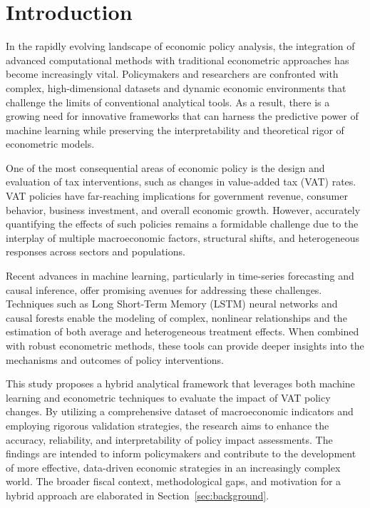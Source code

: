 \section{Introduction}


In the rapidly evolving landscape of economic policy analysis, the integration of advanced computational methods with traditional econometric approaches has become increasingly vital. Policymakers and researchers are confronted with complex, high-dimensional datasets and dynamic economic environments that challenge the limits of conventional analytical tools. As a result, there is a growing need for innovative frameworks that can harness the predictive power of machine learning while preserving the interpretability and theoretical rigor of econometric models.

One of the most consequential areas of economic policy is the design and evaluation of tax interventions, such as changes in value-added tax (VAT) rates. VAT policies have far-reaching implications for government revenue, consumer behavior, business investment, and overall economic growth. However, accurately quantifying the effects of such policies remains a formidable challenge due to the interplay of multiple macroeconomic factors, structural shifts, and heterogeneous responses across sectors and populations.

Recent advances in machine learning, particularly in time-series forecasting and causal inference, offer promising avenues for addressing these challenges. Techniques such as Long Short-Term Memory (LSTM) neural networks and causal forests enable the modeling of complex, nonlinear relationships and the estimation of both average and heterogeneous treatment effects. When combined with robust econometric methods, these tools can provide deeper insights into the mechanisms and outcomes of policy interventions.

This study proposes a hybrid analytical framework that leverages both machine learning and econometric techniques to evaluate the impact of VAT policy changes. By utilizing a comprehensive dataset of macroeconomic indicators and employing rigorous validation strategies, the research aims to enhance the accuracy, reliability, and interpretability of policy impact assessments. The findings are intended to inform policymakers and contribute to the development of more effective, data-driven economic strategies in an increasingly complex world. The broader fiscal context, methodological gaps, and motivation for a hybrid approach are elaborated in Section~\ref{sec:background}.


